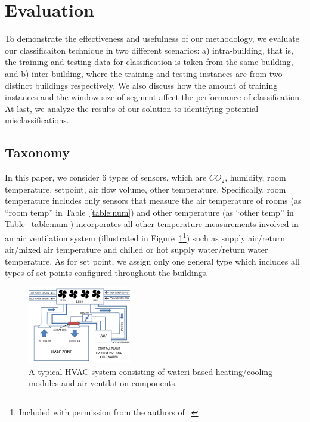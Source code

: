 \section{Evaluation}
To demonstrate the effectiveness and usefulness of our methodology, we evaluate our classificaiton technique in two different scenarios: a) intra-building, that is, the 
training and testing data for classification is taken from the same building, and b) inter-building, where the training and testing instances are from two 
distinct buildings respectively. We also discuss how the amount of training instances and the window size of segment affect the performance of classification.
At last, we analyze the results of our solution to identifying potential misclassifications.

\subsection{Taxonomy}
In this paper, we consider 6 types of sensors, which are $CO_{2}$, humidity, room temperature, setpoint, air flow volume, other temperature. Specifically, room 
temperature includes only sensors that measure the air temperature of rooms (as ``room temp'' in Table~\ref{table:num}) and other temperature (as ``other temp'' 
in Table~\ref{table:num}) incorporates all other temperature measurements involved in an air ventilation system (illustrated in Figure~\ref{fig:hvac}\footnote{Included 
with permission from the authors of~\cite{sentinel}.}) such as supply air/return air/mixed air temperature and chilled or hot supply water/return water temperature. 
As for set point, we assign only one general type which includes all types of set points configured throughout the buildings.

\begin{figure}[ht!]
\centering
\includegraphics[width=0.4\textwidth]{./fig/hvac.pdf}
\caption{A typical HVAC system consisting of wateri-based heating/cooling modules and air ventilation components.}
\label{fig:hvac}
\end{figure}

